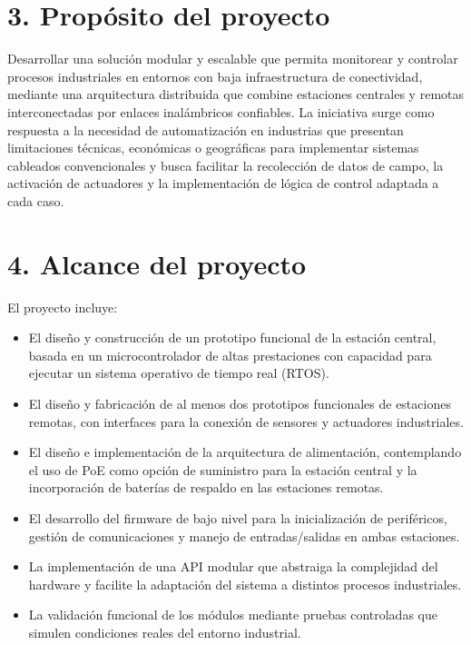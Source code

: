 \documentclass[
11pt, %
]{charter}
\begin{document}
\newpage
\section{3. Propósito del proyecto}
\label{sec:proposito}

Desarrollar una solución modular y escalable que permita monitorear y controlar procesos industriales en entornos con baja infraestructura de conectividad, mediante una arquitectura distribuida que combine estaciones centrales y remotas interconectadas por enlaces inalámbricos confiables. La iniciativa surge como respuesta a la necesidad de automatización en industrias que presentan limitaciones técnicas, económicas o geográficas para implementar sistemas cableados convencionales y busca facilitar la recolección de datos de campo, la activación de actuadores y la implementación de lógica de control adaptada a cada caso. %

\section{4. Alcance del proyecto}
\label{sec:alcance}

El proyecto incluye:
\begin{itemize}
	\item El diseño y construcción de un prototipo funcional de la estación central, basada en un microcontrolador de altas prestaciones con capacidad para ejecutar un sistema operativo de tiempo real (RTOS).
	\item El diseño y fabricación de al menos dos prototipos funcionales de estaciones remotas, con interfaces para la conexión de sensores y actuadores industriales.
	\item El diseño e implementación de la arquitectura de alimentación, contemplando el uso de PoE como opción de suministro para la estación central y la incorporación de baterías de respaldo en las estaciones remotas.
	\item El desarrollo del firmware de bajo nivel para la inicialización de periféricos, gestión de comunicaciones y manejo de entradas/salidas en ambas estaciones.
	\item La implementación de una API modular que abstraiga la complejidad del hardware y facilite la adaptación del sistema a distintos procesos industriales.
	\item La validación funcional de los módulos mediante pruebas controladas que simulen condiciones reales del entorno industrial.
\end{itemize}
\end{document}
